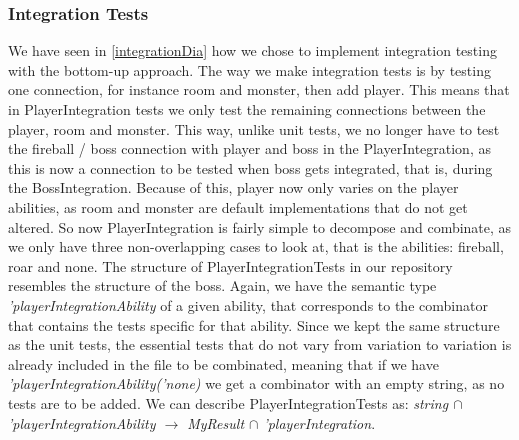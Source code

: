 \subsubsection{Integration Tests}
We have seen in \autoref{integrationDia} how we chose to implement integration testing with the bottom-up approach. The way we make integration tests is by testing one connection, for instance room and monster, then add player. This means that in PlayerIntegration tests we only test the remaining connections between the player, room and monster. This way, unlike unit tests, we no longer have to test the fireball / boss connection with player and boss in the PlayerIntegration, as this is now a connection to be tested when boss gets integrated, that is, during the BossIntegration. Because of this, player now only varies on the player abilities, as room and monster are default implementations that do not get altered. So now PlayerIntegration is fairly simple to decompose and combinate, as we only have three non-overlapping cases to look at, that is the abilities: fireball, roar and none. The structure of PlayerIntegrationTests in our repository resembles the structure of the boss. Again, we have the semantic type \textit{'playerIntegrationAbility} of a given ability, that corresponds to the combinator that contains the tests specific for that ability. Since we kept the same structure as the unit tests, the essential tests that do not vary from variation to variation is already included in the file to be combinated, meaning that if we have \textit{'playerIntegrationAbility('none)} we get a combinator with an empty string, as no tests are to be added. We can describe PlayerIntegrationTests as: \textit{string $\cap$ 'playerIntegrationAbility $\to$ MyResult $\cap$ 'playerIntegration}. \\
